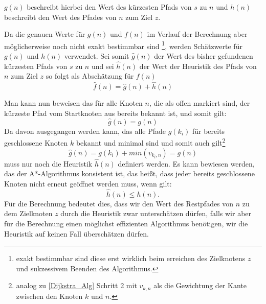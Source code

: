 		$g(n)$ beschreibt hierbei den Wert des kürzesten Pfads von $s$ zu $n$ und $h(n)$ beschreibt den Wert des Pfades von $n$ zum Ziel $z$.
		
		Da die genauen Werte für $g(n)$ und $f(n)$ im Verlauf der Berechnung aber möglicherweise noch nicht exakt bestimmbar sind \footnote{exakt bestimmbar sind diese erst wirklich beim erreichen des Zielknotens $z$ und sukzessivem Beenden des Algorithmus.}, werden Schätzwerte für $g(n)$ und $h(n)$ verwendet. Sei somit $\hat{g}(n)$ der Wert des bisher gefundenen kürzesten Pfads von $s$ zu $n$ und sei $\hat{h}(n)$ der Wert der Heuristik des Pfads von $n$ zum Ziel $z$ so folgt als Abschätzung für $f(n)$
		\begin{equation}
			\hat{f}(n)=\hat{g}(n)+\hat{h}(n)
		\end{equation}
		
		Man kann nun beweisen das für alle Knoten $n$, die als offen markiert sind, der kürzeste Pfad vom Startknoten aus bereits bekannt ist, und somit gilt:
		\begin{equation}
			\hat{g}(n)=g(n)
		\end{equation}
		Da davon ausgegangen werden kann, das alle Pfade $g(k_i)$ für bereits geschlossene Knoten $k$ bekannt und minimal sind und somit auch gilt\footnote{analog zu \ref{Dijkstra_Alg} Schritt 2 mit $v_{k,n}$ als die Gewichtung der Kante zwischen den Knoten $k$ und $n$.}
		\begin{equation}
			\hat{g}(n)=g(k_i)+min(v_{k_i,n})=g(n)
		\end{equation}
		 muss nur noch die Heuristik $\hat{h}(n)$ definiert werden.
		 Es kann bewiesen werden, das der A*-Algorithmus konsistent ist, das heißt, dass jeder bereits geschlossene Knoten nicht erneut geöffnet werden muss, wenn gilt:
		 \begin{equation}
			 \hat{h}(n)\le h(n).
		 \end{equation}
		 Für die Berechnung bedeutet dies, dass wir den Wert des Restpfades von $n$ zu dem Zielknoten $z$ durch die Heuristik zwar unterschätzen dürfen, falls wir aber für die Berechnung einen möglichst effizienten Algorithmus benötigen, wir die Heuristik auf keinen Fall überschätzen dürfen.
		
		
		
	
